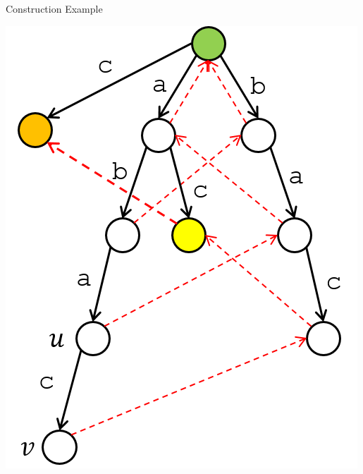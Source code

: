 \documentclass[13pt,onlymath]{beamer}
\begin{document}
\begin{frame}{Construction Example}
\begin{center}
\includegraphics[height=0.5\textheight]{figures/trie5}
\end{center}
\end{frame}
\end{document}
